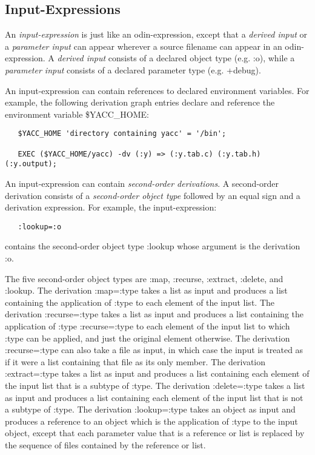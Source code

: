 \subsection{Input-Expressions}
\label{input}

An {\em input-expression} is just like an odin-expression,
except that a {\em derived input} or a {\em parameter input}
can appear wherever a source filename can appear in an odin-expression.
A {\em derived input} consists of a declared object type (e.g. {\ex :o}),
while a {\em parameter input} consists of a declared parameter type
(e.g. {\ex +debug}).

An input-expression can contain references to
declared environment variables.
For example, the following derivation graph entries declare
and reference the environment variable {\ex \$YACC\_HOME}:
\begin{verbatim}
   $YACC_HOME 'directory containing yacc' = '/bin';

   EXEC ($YACC_HOME/yacc) -dv (:y) => (:y.tab.c) (:y.tab.h) (:y.output);
\end{verbatim}

An input-expression can contain {\em second-order derivations}.
A second-order derivation consists of a
{\em second-order object type} followed by an equal sign
and a derivation expression.
For example, the input-expression:
\begin{verbatim}
   :lookup=:o
\end{verbatim}
contains the second-order object type {\ex :lookup} whose
argument is the derivation {\ex :o}.

The five second-order object types are {\ex :map}, {\ex :recurse},
{\ex :extract}, {\ex :delete}, and {\ex :lookup}.
The derivation {\ex :map=:type} takes a list as input and produces
a list containing the application of {\ex :type}
to each element of the input list.
The derivation {\ex :recurse=:type} takes a list
as input and produces a list containing the application of
{\ex :type :recurse=:type} to each element of the input list
to which {\ex :type} can be applied, and just the original
element otherwise.  The derivation {\ex :recurse=:type} can
also take a file as input, in which case the input is treated as
if it were a list containing that file as its only member.
The derivation {\ex :extract=:type} takes a list as input and produces a list
containing each element of the input list that is a subtype of {\ex :type}.
The derivation {\ex :delete=:type} takes a list as input and produces a list
containing each element of the input list that is not a subtype of {\ex :type}.
The derivation {\ex :lookup=:type} takes an object as input and
produces a reference to an object
which is the application of {\ex :type} to the input object,
except that each parameter value that is a reference or list
is replaced by the sequence of files contained by the reference
or list.

